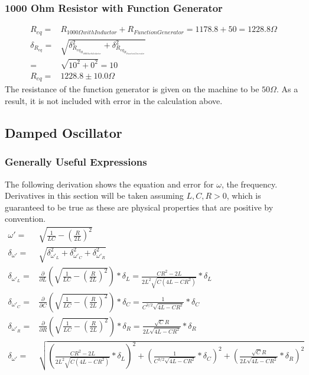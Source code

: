 \documentclass[12pt]{article}
\newcommand{\paren}[1]{\left( {#1} \right)}
\begin{document}
\subsubsection{1000 Ohm Resistor with Function Generator} \label{subsub:1000R_func}
\begin{align}
R_{eq}=&R_{1000\Omega with Inductor} + R_{Function Generator}=1178.8+50=1228.8\Omega \nonumber \\
\delta_{R_{eq}}=&\sqrt{\delta_{R_{{eq}_{R_{1000\Omega with Inductor}}}}^2+\delta_{R_{{eq}_{R_{Function Generator}}}}^2} \nonumber \\
=&\sqrt{10^2+0^2}=10 \nonumber \\
R_{eq}=&1228.8\pm10.0\Omega \label{eq:1000R_w_Inductor_and_Generator}
\end{align}
The resistance of the function generator is given on the machine to be $50\Omega$. As a result, it is not included with error in the calculation above.

\clearpage
\subsection{Damped Oscillator}
\subsubsection{Generally Useful Expressions}
The following derivation shows the equation and error for $\omega$, the frequency. Derivatives in this section will be taken assuming $L, C, R>0$, which is guaranteed to be true as these are physical properties that are positive by convention.
\begin{align}
	\omega'=&\sqrt{\frac{1}{LC}-\paren{\frac{R}{2L}}^2} \label{eq:omega_prime} \\
	\delta_{\omega'}=&\sqrt{\delta_{\omega'_{L}}^2+\delta_{\omega'_{C}}^2+\delta_{\omega'_{R}}^2}  \label{eq:omega_prime_error} \\
	\delta_{\omega'_{L}}=& \frac{\partial}{\partial L}\paren{\sqrt{\frac{1}{LC}-\paren{\frac{R}{2L}}^2}}*\delta_L=\frac{CR^2-2L}{2L^2\sqrt{C(4L-CR^2)}}*\delta_L \nonumber \\
	\delta_{\omega'_{C}}=& \frac{\partial}{\partial C}\paren{\sqrt{\frac{1}{LC}-\paren{\frac{R}{2L}}^2}}*\delta_C=\frac{1}{C^{3/2}\sqrt{4L-CR^2}}*\delta_C \nonumber \\
	\delta_{\omega'_{R}}=& \frac{\partial}{\partial R}\paren{\sqrt{\frac{1}{LC}-\paren{\frac{R}{2L}}^2}}*\delta_R=\frac{\sqrt{C}R}{2L\sqrt{4L-CR^2}}*\delta_R \nonumber \\
	\delta_{\omega'}=&\sqrt{\paren{\frac{CR^2-2L}{2L^2\sqrt{C(4L-CR^2)}}*\delta_L}^2+\paren{\frac{1}{C^{3/2}\sqrt{4L-CR^2}}*\delta_C}^2+\paren{\frac{\sqrt{C}R}{2L\sqrt{4L-CR^2}}*\delta_R}^2} \label{eq:omega_prime_error_fullexpr}
\end{align}
\end{document}
